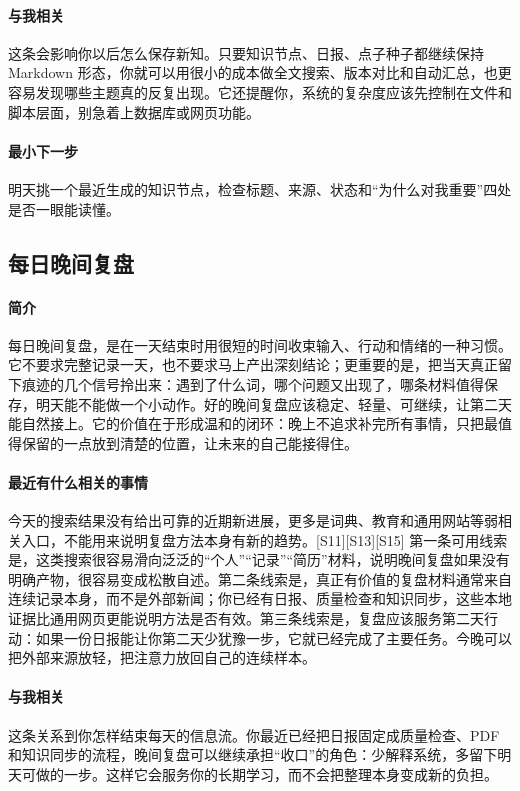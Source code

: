 \documentclass[UTF8,zihao=-4]{ctexart}
\begin{document}
\paragraph{与我相关} 这条会影响你以后怎么保存新知。只要知识节点、日报、点子种子都继续保持 Markdown 形态，你就可以用很小的成本做全文搜索、版本对比和自动汇总，也更容易发现哪些主题真的反复出现。它还提醒你，系统的复杂度应该先控制在文件和脚本层面，别急着上数据库或网页功能。
\paragraph{最小下一步} 明天挑一个最近生成的知识节点，检查标题、来源、状态和“为什么对我重要”四处是否一眼能读懂。
\subsection*{每日晚间复盘}
\paragraph{简介} 每日晚间复盘，是在一天结束时用很短的时间收束输入、行动和情绪的一种习惯。它不要求完整记录一天，也不要求马上产出深刻结论；更重要的是，把当天真正留下痕迹的几个信号拎出来：遇到了什么词，哪个问题又出现了，哪条材料值得保存，明天能不能做一个小动作。好的晚间复盘应该稳定、轻量、可继续，让第二天能自然接上。它的价值在于形成温和的闭环：晚上不追求补完所有事情，只把最值得保留的一点放到清楚的位置，让未来的自己能接得住。
\paragraph{最近有什么相关的事情} 今天的搜索结果没有给出可靠的近期新进展，更多是词典、教育和通用网站等弱相关入口，不能用来说明复盘方法本身有新的趋势。[S11][S13][S15] 第一条可用线索是，这类搜索很容易滑向泛泛的“个人”“记录”“简历”材料，说明晚间复盘如果没有明确产物，很容易变成松散自述。第二条线索是，真正有价值的复盘材料通常来自连续记录本身，而不是外部新闻；你已经有日报、质量检查和知识同步，这些本地证据比通用网页更能说明方法是否有效。第三条线索是，复盘应该服务第二天行动：如果一份日报能让你第二天少犹豫一步，它就已经完成了主要任务。今晚可以把外部来源放轻，把注意力放回自己的连续样本。
\paragraph{与我相关} 这条关系到你怎样结束每天的信息流。你最近已经把日报固定成质量检查、PDF 和知识同步的流程，晚间复盘可以继续承担“收口”的角色：少解释系统，多留下明天可做的一步。这样它会服务你的长期学习，而不会把整理本身变成新的负担。
\end{document}
